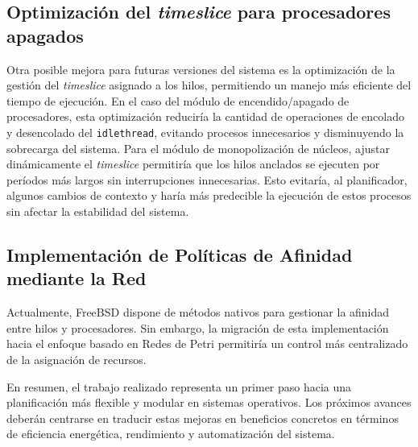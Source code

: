 \subsection{Optimización del \textit{timeslice} para procesadores apagados}
Otra posible mejora para futuras versiones del sistema es la optimización de la gestión del \textit{timeslice} asignado a los hilos, permitiendo un manejo más eficiente del tiempo de ejecución. En el caso del módulo de encendido/apagado de procesadores, esta optimización reduciría la cantidad de operaciones de encolado y desencolado del \texttt{idlethread}, evitando procesos innecesarios y disminuyendo la sobrecarga del sistema. Para el módulo de monopolización de núcleos, ajustar dinámicamente el \textit{timeslice} permitiría que los hilos anclados se ejecuten por períodos más largos sin interrupciones innecesarias. Esto evitaría, al planificador, algunos cambios de contexto y haría más predecible la ejecución de estos procesos sin afectar la estabilidad del sistema.\par

\subsection{Implementación de Políticas de Afinidad mediante la Red}
Actualmente, FreeBSD dispone de métodos nativos para gestionar la afinidad entre hilos y procesadores. Sin embargo, la migración de esta implementación hacia el enfoque basado en Redes de Petri permitiría un control más centralizado de la asignación de recursos.\par

En resumen, el trabajo realizado representa un primer paso hacia una planificación más flexible y modular en sistemas operativos. Los próximos avances deberán centrarse en traducir estas mejoras en beneficios concretos en términos de eficiencia energética, rendimiento y automatización del sistema.\par